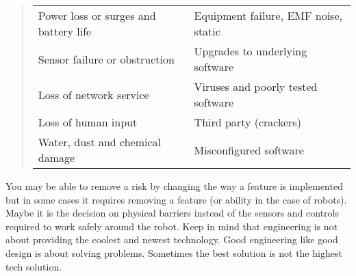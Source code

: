 \begin{quote}
\begin{longtable}[]{@{}ll@{}}
\toprule
\endhead
\begin{minipage}[t]{0.47\columnwidth}\raggedright
Power loss or surges and battery life\strut
\end{minipage} & \begin{minipage}[t]{0.47\columnwidth}\raggedright
Equipment failure, EMF noise, static\strut
\end{minipage}\tabularnewline
\begin{minipage}[t]{0.47\columnwidth}\raggedright
Sensor failure or obstruction\strut
\end{minipage} & \begin{minipage}[t]{0.47\columnwidth}\raggedright
Upgrades to underlying software\strut
\end{minipage}\tabularnewline
\begin{minipage}[t]{0.47\columnwidth}\raggedright
Loss of network service\strut
\end{minipage} & \begin{minipage}[t]{0.47\columnwidth}\raggedright
Viruses and poorly tested software\strut
\end{minipage}\tabularnewline
\begin{minipage}[t]{0.47\columnwidth}\raggedright
Loss of human input\strut
\end{minipage} & \begin{minipage}[t]{0.47\columnwidth}\raggedright
Third party (crackers)\strut
\end{minipage}\tabularnewline
\begin{minipage}[t]{0.47\columnwidth}\raggedright
Water, dust and chemical damage\strut
\end{minipage} & \begin{minipage}[t]{0.47\columnwidth}\raggedright
Misconfigured software\strut
\end{minipage}\tabularnewline
\bottomrule
\end{longtable}
\end{quote}

You may be able to remove a risk by changing the way a feature is
implemented but in some cases it requires removing a feature (or ability
in the case of robots). Maybe it is the decision on physical barriers
instead of the sensors and controls required to work safely around the
robot. Keep in mind that engineering is not about providing the coolest
and newest technology. Good engineering like good design is about
solving problems. Sometimes the best solution is not the highest tech
solution.

